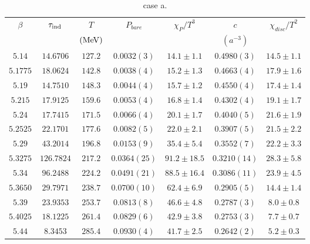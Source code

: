 \begin{table}
\begin{center}
\begin{tabular}{c|c|c|c|c|c|c}
    \hline    
 $\beta$ & $\tau_{\rm ind}$ & $T$ & $P_{bare}$ & $\chi _P/T^3$ & $c$ & $\chi_{disc}/T^2$ \\
   & & $({\rm MeV})$ & & & $(a^{-3})$ & \\
\hline
 $5.14$ & $14.6706$ & $127.2$ & $0.0032(3)$ & $14.1\pm 1.1$ & $0.4980(3)$ & $14.5\pm 1.1$ \\
\hline
 $5.1775$ & $18.0624$ & $142.8$ & $0.0038(4)$ & $15.2\pm 1.3$ & $0.4663(4)$ & $17.9\pm 1.6$ \\
\hline
 $5.19$ & $14.7510$ & $148.3$ & $0.0044(4)$ & $15.7\pm 1.2$ & $0.4550(4)$ & $17.4\pm 1.4$ \\
\hline
 $5.215$ & $17.9125$ & $159.6$ & $0.0053(4)$ & $16.8\pm 1.4$ & $0.4302(4)$ & $19.1\pm 1.7$ \\
\hline
 $5.24$ & $17.7415$ & $171.5$ & $0.0066(4)$ & $20.1\pm 1.7$ & $0.4040(5)$ & $21.6\pm 1.9$ \\
\hline
 $5.2525$ & $22.1701$ & $177.6$ & $0.0082(5)$ & $22.0\pm 2.1$ & $0.3907(5)$ & $21.5\pm 2.2$ \\
\hline
 $5.29$ & $43.2014$ & $196.8$ & $0.0153(9)$ & $35.4\pm 5.4$ & $0.3552(7)$ & $22.2\pm 3.3$ \\
\hline
\textcolor[rgb]{1,0,0}{$5.3275$} & $126.7824$ & $217.2$ & $0.0364(25)$ & \textcolor[rgb]{1,0,0}{$91.2\pm 18.5$} & $0.3210(14)$ & \textcolor[rgb]{1,0,0}{$28.3\pm 5.8$} \\
\hline
 $5.34$ & $96.2488$ & $224.2$ & $0.0491(21)$ & $88.5\pm 16.4$ & $0.3086(11)$ & $23.9\pm 4.5$ \\
\hline
 $5.3650$ & $29.7971$ & $238.7$ & $0.0700(10)$ & $62.4\pm 6.9$ & $0.2905(5)$ & $14.4\pm 1.4$ \\
\hline
 $5.39$ & $23.9353$ & $253.7$ & $0.0813(8)$ & $46.6\pm 4.8$ & $0.2787(3)$ & $8.0\pm 0.8$ \\
\hline
 $5.4025$ & $18.1225$ & $261.4$ & $0.0829(6)$ & $42.9\pm 3.8$ & $0.2753(3)$ & $7.7\pm 0.7$ \\
\hline
 $5.44$ & $8.3453$ & $285.4$ & $0.0930(4)$ & $41.7\pm 2.5$ & $0.2642(2)$ & $5.2\pm 0.3$ \\
\hline
\end{tabular}
\end{center}
\caption{\label{tab.res.staggeredam1res1}case a.}
\end{table}

